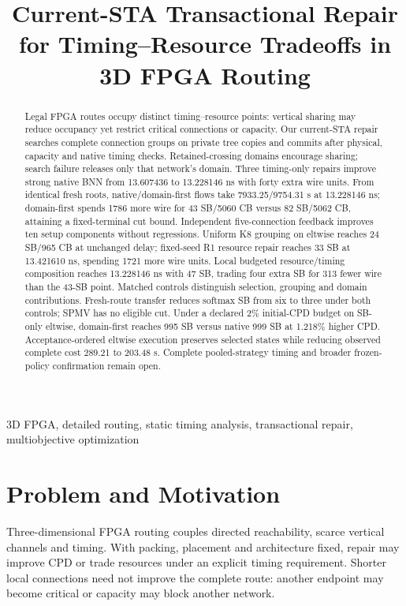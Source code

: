 \documentclass[conference,10pt]{IEEEtran}
\title{Current-STA Transactional Repair for Timing--Resource Tradeoffs in 3D FPGA Routing}
\author{\IEEEauthorblockN{Anonymous development manuscript}}
\begin{document}
\maketitle
\begin{abstract}
Legal FPGA routes occupy distinct timing--resource points: vertical sharing may reduce occupancy yet restrict critical connections or capacity. Our current-STA repair searches complete connection groups on private tree copies and commits after physical, capacity and native timing checks. Retained-crossing domains encourage sharing; search failure releases only that network's domain. Three timing-only repairs improve strong native BNN from 13.607436 to 13.228146 ns with forty extra wire units. From identical fresh roots, native/domain-first flows take 7933.25/9754.31 s at 13.228146 ns; domain-first spends 1786 more wire for 43 SB/5060 CB versus 82 SB/5062 CB, attaining a fixed-terminal cut bound. Independent five-connection feedback improves ten setup components without regressions. Uniform K8 grouping on eltwise reaches 24 SB/965 CB at unchanged delay; fixed-seed R1 resource repair reaches 33 SB at 13.421610 ns, spending 1721 more wire units. Local budgeted resource/timing composition reaches 13.228146 ns with 47 SB, trading four extra SB for 313 fewer wire than the 43-SB point. Matched controls distinguish selection, grouping and domain contributions. Fresh-route transfer reduces softmax SB from six to three under both controls; SPMV has no eligible cut. Under a declared 2\% initial-CPD budget on SB-only eltwise, domain-first reaches 995 SB versus native 999 SB at 1.218\% higher CPD. Acceptance-ordered eltwise execution preserves selected states while reducing observed complete cost 289.21 to 203.48 s. Complete pooled-strategy timing and broader frozen-policy confirmation remain open.
\end{abstract}
\begin{IEEEkeywords}
3D FPGA, detailed routing, static timing analysis, transactional repair, multiobjective optimization
\end{IEEEkeywords}

\section{Problem and Motivation}
Three-dimensional FPGA routing couples directed reachability, scarce vertical channels and timing. With packing, placement and architecture fixed, repair may improve CPD or trade resources under an explicit timing requirement. Shorter local connections need not improve the complete route: another endpoint may become critical or capacity may block another network.
\end{document}

